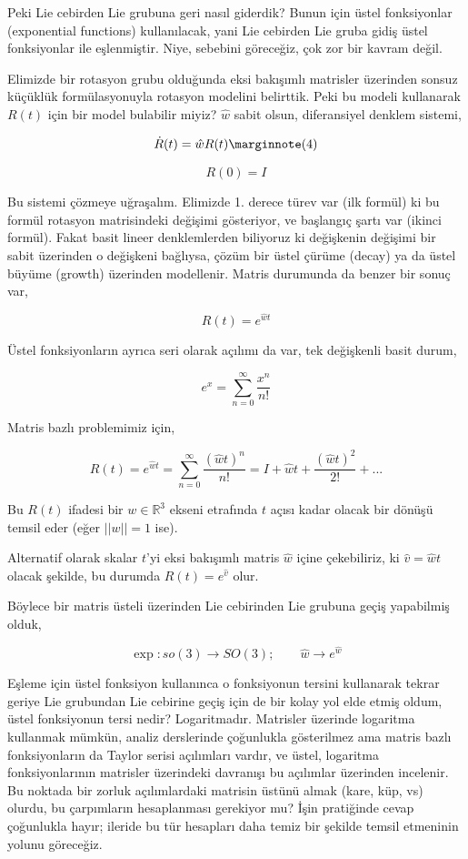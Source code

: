 \documentclass[12pt,fleqn]{article}\usepackage{../../common}
\begin{document}
Peki Lie cebirden Lie grubuna geri nasıl giderdik? Bunun için üstel
fonksiyonlar (exponential functions) kullanılacak, yani Lie cebirden Lie
gruba gidiş üstel fonksiyonlar ile eşlenmiştir. Niye, sebebini göreceğiz,
çok zor bir kavram değil.  

Elimizde bir rotasyon grubu olduğunda eksi bakışımlı matrisler üzerinden
sonsuz küçüklük formülasyonuyla rotasyon modelini belirttik. Peki bu modeli
kullanarak $R(t)$ için bir model bulabilir miyiz? $\hat{w}$ sabit olsun,
diferansiyel denklem sistemi, 

$$ 
\dot{R}(t) = \hat{w} R(t) 
\mlabel{4}
$$

$$ R(0) = I $$

Bu sistemi çözmeye uğraşalım. Elimizde 1. derece türev var (ilk formül) ki
bu formül rotasyon matrisindeki değişimi gösteriyor, ve başlangıç şartı var
(ikinci formül). Fakat basit lineer denklemlerden biliyoruz ki değişkenin
değişimi bir sabit üzerinden o değişkeni bağlıysa, çözüm bir üstel çürüme
(decay) ya da üstel büyüme (growth) üzerinden modellenir. Matris durumunda
da benzer bir sonuç var,

$$ R(t) = e^{\hat{w} t} $$

Üstel fonksiyonların ayrıca seri olarak açılımı da var, tek değişkenli
basit durum,

$$ e^x = \sum _{n=0}^{\infty} \frac{x^n}{n!}  $$

Matris bazlı problemimiz için,

$$ R(t) = e^{\hat{w} t} = 
\sum _{n=0}^{\infty} \frac{(\hat{w}t)^n}{n!} = I + \hat{w}t + \frac{(\hat{w}t)^2}{2!}+...
$$

Bu $R(t)$ ifadesi bir $w \in \mathbb{R}^3$ ekseni etrafında $t$ açısı kadar
olacak bir dönüşü temsil eder (eğer $||w||=1$ ise). 

Alternatif olarak skalar $t$'yi eksi bakışımlı matris $\hat{w}$ içine
çekebiliriz, ki $\hat{v} = \hat{w}t$ olacak şekilde, bu durumda 
$R(t) = e^{\hat{v}}$ olur. 

Böylece bir matris üsteli üzerinden Lie cebirinden Lie grubuna geçiş
yapabilmiş olduk, 

$$ \exp: so(3) \to SO(3); \qquad \hat{w} \to e^{\hat{w}} $$

Eşleme için üstel fonksiyon kullanınca o fonksiyonun tersini kullanarak
tekrar geriye Lie grubundan Lie cebirine geçiş için de bir kolay yol elde
etmiş oldum, üstel fonksiyonun tersi nedir? Logaritmadır. Matrisler
üzerinde logaritma kullanmak mümkün, analiz derslerinde çoğunlukla
gösterilmez ama matris bazlı fonksiyonların da Taylor serisi açılımları
vardır, ve üstel, logaritma fonksiyonlarının matrisler üzerindeki davranışı
bu açılımlar üzerinden incelenir. Bu noktada bir zorluk açılımlardaki
matrisin üstünü almak (kare, küp, vs) olurdu, bu çarpımların hesaplanması
gerekiyor mu? İşin pratiğinde cevap çoğunlukla hayır; ileride bu tür
hesapları daha temiz bir şekilde temsil etmeninin yolunu göreceğiz.
\end{document}

